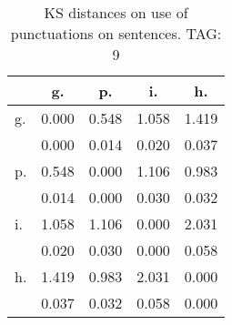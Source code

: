 \begin{table}[h!]
\begin{center}
\begin{tabular}{| l | c | c | c | c |}\hline
 & g. & p. & i. & h. \\\hline
g. & 0.000  & 0.548  & 1.058  & 1.419 \\\hline
 & 0.000  & 0.014  & 0.020  & 0.037 \\\hline
p. & 0.548  & 0.000  & 1.106  & 0.983 \\\hline
 & 0.014  & 0.000  & 0.030  & 0.032 \\\hline
i. & 1.058  & 1.106  & 0.000  & 2.031 \\\hline
 & 0.020  & 0.030  & 0.000  & 0.058 \\\hline
h. & 1.419  & 0.983  & 2.031  & 0.000 \\\hline
 & 0.037  & 0.032  & 0.058  & 0.000 \\\hline
\end{tabular}
\caption{KS distances on use of punctuations on sentences. TAG: 9}
\end{center}
\end{table}